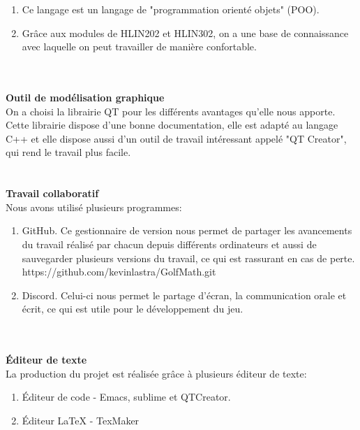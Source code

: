 \documentclass{article}
\begin{document}
\begin{enumerate}
\item Ce langage est un langage de "programmation orienté objets" (POO).
\item Grâce aux modules de HLIN202 et HLIN302, on a une base de connaissance avec laquelle on peut travailler de manière confortable.
\end{enumerate}
~\\~\\
\textbf{\large Outil de modélisation graphique}\\
On a choisi la librairie QT pour les différents avantages qu'elle nous apporte. Cette librairie dispose d'une bonne documentation, elle est adapté au langage C++ et elle dispose aussi d'un outil de travail intéressant appelé "QT Creator", qui rend le travail plus facile.\\~\\~\\
\textbf{\large Travail collaboratif}\\
Nous avons utilisé plusieurs programmes:
\begin{enumerate}
\item GitHub. Ce gestionnaire de version nous permet de partager les avancements du travail réalisé par chacun depuis différents ordinateurs et aussi de sauvegarder plusieurs versions du travail, ce qui est rassurant en cas de perte. 
https://github.com/kevinlastra/GolfMath.git
\item Discord. Celui-ci nous permet le partage d'écran, la communication orale et écrit, ce qui est utile pour le développement du jeu.
\end{enumerate}
~\\~\\
\textbf{\large Éditeur de texte}\\
La production du projet est réalisée grâce à plusieurs éditeur de texte:
\begin{enumerate}
\item Éditeur de code -
Emacs, sublime et QTCreator.
\item Éditeur \LaTeX{} - TexMaker
\end{enumerate} 
\newpage
\end{document}
